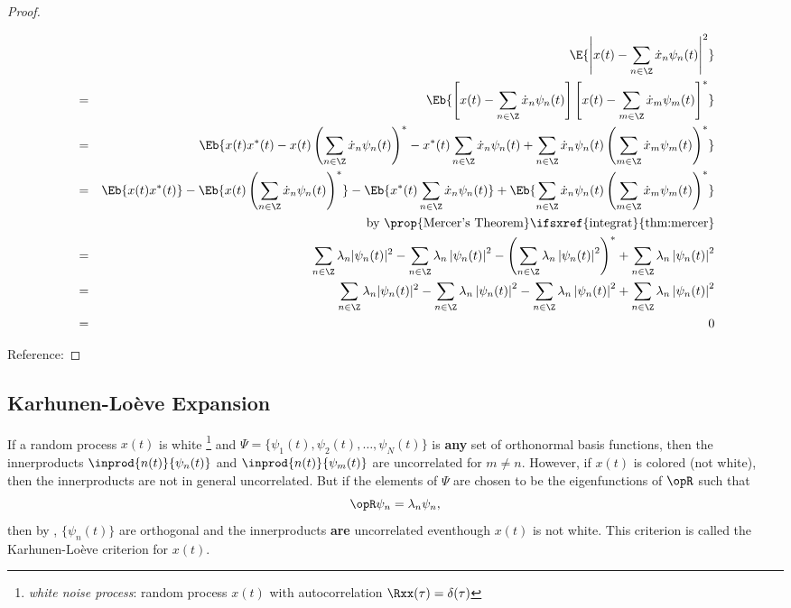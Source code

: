 \begin{proof}
\begin{enumerate}
\begin{eqnarray*}
  &&\E{\left| x(t)-\sum_{n\in\Z}\dot{x}_n \psi_n(t) \right|^2}
  \\&=& \Eb{\left[ x(t)-\sum_{n\in\Z}\dot{x}_n \psi_n(t) \right]\left[ x(t)-\sum_{m\in\Z}\dot{x}_m \psi_m(t) \right]^\ast}
  \\&=& \Eb{x(t)x^\ast(t) -x(t)\left(\sum_{n\in\Z}\dot{x}_n \psi_n(t)\right)^\ast -x^\ast(t)\sum_{n\in\Z}\dot{x}_n \psi_n(t) + \sum_{n\in\Z}\dot{x}_n \psi_n(t) \left(\sum_{m\in\Z}\dot{x}_m \psi_m(t) \right)^\ast }
  \\&=& \Eb{x(t)x^\ast(t)} -\Eb{x(t)\left(\sum_{n\in\Z}\dot{x}_n \psi_n(t)\right)^\ast} -\Eb{x^\ast(t)\sum_{n\in\Z}\dot{x}_n \psi_n(t)} + \Eb{\sum_{n\in\Z}\dot{x}_n \psi_n(t) \left(\sum_{m\in\Z}\dot{x}_m \psi_m(t) \right)^\ast }
  \\&&  \text{by \prop{Mercer's Theorem}\ifsxref{integrat}{thm:mercer}}
  \\&=& \sum_{n\in\Z}\lambda_n |\psi_n(t)|^2 -\sum_{n\in\Z}\lambda_n \left|\psi_n(t) \right|^2  -\left(\sum_{n\in\Z}\lambda_n \left|\psi_n(t) \right|^2\right)^\ast + \sum_{n\in\Z}\lambda_n \left|\psi_n(t) \right|^2
  \\&=& \sum_{n\in\Z}\lambda_n |\psi_n(t)|^2 -\sum_{n\in\Z}\lambda_n \left|\psi_n(t) \right|^2  -\sum_{n\in\Z}\lambda_n \left|\psi_n(t) \right|^2 + \sum_{n\in\Z}\lambda_n \left|\psi_n(t) \right|^2
  \\&=& 0
\end{eqnarray*}
\end{enumerate}
Reference: 
\end{proof}

\subsection{Karhunen-Lo\`{e}ve Expansion}
\label{sec:KL}
If a random process $x(t)$ is white
\footnote{{\em white noise process}: random process $x(t)$ with autocorrelation $\Rxx(\tau)=\delta(\tau)$}
and $\Psi=\{\psi_1(t),\psi_2(t),\ldots,\psi_N(t)\}$ is \textbf{any} set of orthonormal basis functions,
then the innerproducts
$\inprod{n(t)}{\psi_n(t)}$ and $\inprod{n(t)}{\psi_m(t)}$ are uncorrelated
for $m\ne  n$.
However, if $x(t)$ is colored (not white), then the innerproducts are not
in general uncorrelated.
But if the elements of $\Psi$ are chosen to be the eigenfunctions of $\opR$ such
that
\[ \opR \psi_n = \lambda_n \psi_n,\]
then by , $\{\psi_n(t)\}$ are orthogonal and
the innerproducts \textbf{are} uncorrelated eventhough $x(t)$ is
not white.
This criterion is called the  Karhunen-Lo\`{e}ve criterion for $x(t)$.




